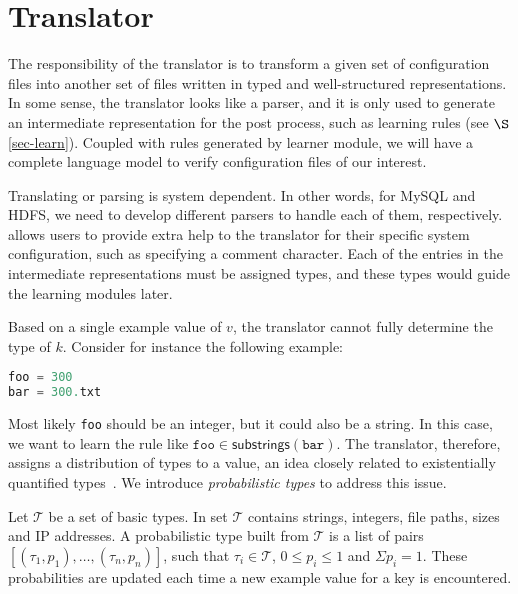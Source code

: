 
\section{Translator}
\label{sec-trans}

The responsibility of the translator is to transform a given set of
configuration files into another set of files written in
typed and well-structured representations.
In some sense, the translator looks like a parser, and it is only
used to generate an intermediate representation for the post
process, such as learning rules (see $\S$\ref{sec-learn}).
Coupled with rules generated by learner module,
we will have a complete language model to verify configuration files
of our interest.

Translating or parsing is system dependent. In other words, for MySQL
and HDFS, we need to develop different parsers to handle each of them,
respectively. \app allows users to provide extra help to the translator
for their specific system configuration, such as specifying a comment 
character. Each of the entries in the intermediate representations
must be assigned types, and these types would guide the learning
modules later.


Based on a single example value of $v$,
the translator cannot fully determine the type of $k$.
Consider for instance the following example:

\begin{lstlisting}[language=C, xleftmargin=.01\textwidth]
foo = 300
bar = 300.txt
\end{lstlisting} 

Most likely {\tt foo} should be an integer, but it could also be a string.
In this case, we want to learn the rule like 
$ \texttt{foo} \in \textsf{substrings}(\texttt{bar})$. 
The translator, therefore, assigns a distribution of types 
to a value, an idea closely related to existentially quantified 
types~\cite{Launchbury93lazyfunctional}. 
We introduce {\em probabilistic types} to address this issue.

Let $\mathcal{T}$ be a set of basic types. 
In \app set $\mathcal{T}$ contains strings, integers, file paths, 
sizes and IP addresses. 
A probabilistic type built from $\mathcal{T}$ is a list of pairs 
$[(\tau_1, p_1),\ldots,(\tau_n, p_n)]$,
such that $\tau_i \in \mathcal{T}$, $0 \le p_i \le 1$ 
and $\Sigma p_i = 1$. 
These probabilities are updated each time a new example value 
for a key is encountered.

